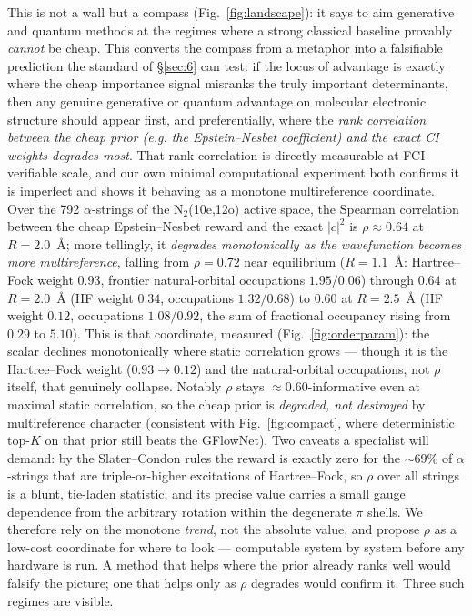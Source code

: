 \documentclass[11pt]{article}
\begin{document}
This is not a wall but a compass (Fig.~\ref{fig:landscape}): it says to aim generative and quantum methods at the regimes where a strong classical baseline provably \emph{cannot} be cheap. This converts the compass from a metaphor into a falsifiable prediction the standard of \S\ref{sec:6} can test: if the locus of advantage is exactly where the cheap importance signal misranks the truly important determinants, then any genuine generative or quantum advantage on molecular electronic structure should appear first, and preferentially, where the \emph{rank correlation between the cheap prior (e.g. the Epstein--Nesbet coefficient) and the exact CI weights degrades most}. That rank correlation is directly measurable at FCI-verifiable scale, and our own minimal computational experiment both confirms it is imperfect and shows it behaving as a monotone multireference coordinate. Over the 792 $\alpha$-strings of the N$_2$(10e,12o) active space, the Spearman correlation between the cheap Epstein--Nesbet reward and the exact $|c|^2$ is $\rho{\approx}0.64$ at $R=2.0$~\AA{}; more tellingly, it \emph{degrades monotonically as the wavefunction becomes more multireference}, falling from $\rho{=}0.72$ near equilibrium ($R=1.1$~\AA{}: Hartree--Fock weight $0.93$, frontier natural-orbital occupations $1.95/0.06$) through $0.64$ at $R=2.0$~\AA{} (HF weight $0.34$, occupations $1.32/0.68$) to $0.60$ at $R=2.5$~\AA{} (HF weight $0.12$, occupations $1.08/0.92$, the sum of fractional occupancy rising from $0.29$ to $5.10$). This is that coordinate, measured (Fig.~\ref{fig:orderparam}): the scalar declines monotonically where static correlation grows --- though it is the Hartree--Fock weight ($0.93\to0.12$) and the natural-orbital occupations, not $\rho$ itself, that genuinely collapse. Notably $\rho$ stays ${\approx}0.60$-informative even at maximal static correlation, so the cheap prior is \emph{degraded, not destroyed} by multireference character (consistent with Fig.~\ref{fig:compact}, where deterministic top-$K$ on that prior still beats the GFlowNet). Two caveats a specialist will demand: by the Slater--Condon rules the reward is exactly zero for the ${\sim}69\%$ of $\alpha$-strings that are triple-or-higher excitations of Hartree--Fock, so $\rho$ over all strings is a blunt, tie-laden statistic; and its precise value carries a small gauge dependence from the arbitrary rotation within the degenerate $\pi$ shells. We therefore rely on the monotone \emph{trend}, not the absolute value, and propose $\rho$ as a low-cost coordinate for where to look --- computable system by system before any hardware is run. A method that helps where the prior already ranks well would falsify the picture; one that helps only as $\rho$ degrades would confirm it. Three such regimes are visible.
\end{document}

